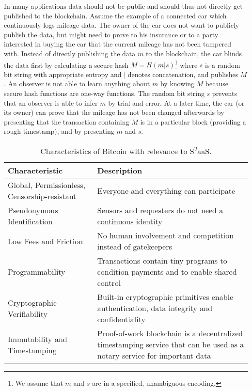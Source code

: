 In many applications data should not be public and should thus not directly get published to the blockchain. Assume the example of a connected car which continuously logs mileage data. The owner of the car does not want to publicly publish the data, but might need to prove to his insurance or to a party interested in buying the car that the current mileage has not been tampered with. Instead of directly publishing the data $m$ to the blockchain, the car blinds the data first by calculating a secure hash $M=H(m|s)$\footnote{We assume that $m$ and $s$ are in a specified, unambiguous encoding.} where $s$ is a random bit string with appropriate entropy and $|$ denotes concatenation, and publishes $M$. An observer is not able to learn anything about $m$ by knowing $M$ because secure hash functions are one-way functions. The random bit string $s$ prevents that an observer is able to infer $m$ by trial and error. At a later time, the car (or its owner) can prove that the mileage has not been changed afterwards by presenting that the transaction containing $M$ is in a particular block (providing a rough timestamp), and by presenting $m$ and $s$. 

\begin{table}\footnotesize
  \centering
  \begin{tabularx}{\textwidth}{ p{2.5cm}  X }
    \toprule
    Characteristic & Description \\
    \midrule
    Global, Permissionless, Censorship-resistant & Everyone and everything can participate \\ 
    Pseudonymous Identification & Sensors and requesters do not need a continuous identity  \\ 
    Low Fees and Friction & No human involvement and competition instead of gatekeepers \\  
    Programmability & Transactions contain tiny programs to condition payments and to enable shared control \\  
    Cryptographic Verifiability & Built-in cryptographic primitives enable authentication, data integrity and confidentiality \\ 
    Immutability and Timestamping & Proof-of-work blockchain is a decentralized timestamping service that can be used as a notary service for important data \\
    \bottomrule
  \end{tabularx}
  \caption{Characteristics of Bitcoin with relevance to S\textsuperscript{2}aaS.}
  \label{tbl:sensors}
\end{table}


